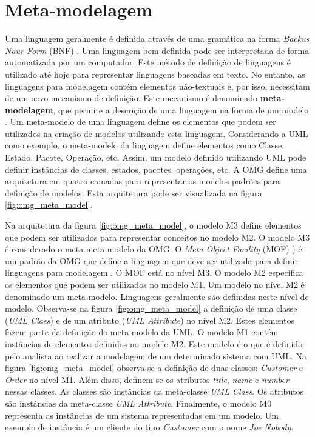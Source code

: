 \section{Meta-modelagem}

Uma linguagem geralmente é definida através de uma gramática na forma \textit{Backus Naur Form} (BNF) . Uma linguagem
bem definida pode ser interpretada de forma automatizada por um computador. Este método de definição de linguagens é utilizado até hoje para
representar linguagens baseadas em texto. No entanto, as linguagens para modelagem contém elementos não-textuais e, por isso, necessitam de um novo
mecanismo de definição. Este mecanismo é denominado \textbf{meta-modelagem}, que permite a descrição de uma linguagem na forma de um modelo
\cite{mda:03}. Um meta-modelo de uma linguagem define os elementos que podem ser utilizados na criação de modelos utilizando esta linguagem.
Considerando a UML como exemplo, o meta-modelo da linguagem define elementos como Classe, Estado, Pacote, Operação, etc. Assim, um modelo definido
utilizando UML pode definir instâncias de classes, estados, pacotes, operações, etc. A OMG define uma arquitetura em quatro camadas para representar
os modelos padrões para definição de modelos. Esta arquitetura pode ser visualizada
na figura \ref{fig:omg_meta_model}. 

Na arquitetura da figura \ref{fig:omg_meta_model}, o modelo M3 define elementos que podem ser utilizados para representar conceitos no
modelo M2. O modelo M3 é considerado o meta-meta-modelo da OMG. O \textit{Meta-Object Facility} (MOF)
) é um padrão da OMG que define a linguagem que
deve ser utilizada para definir linguagens para modelagem \cite{mof:11}. O MOF
está no nível M3. O modelo M2 especifica os elementos que podem ser utilizados no modelo M1.
Um modelo no nível M2 é denominado um meta-modelo. Linguagens geralmente são
definidas neste nível de modelo. Observa-se na figura \ref{fig:omg_meta_model} a
definição de uma classe (\textit{UML Class}) e de um atributo (\textit{UML Attribute}) 
no nível M2. Estes elementos fazem parte da definição do meta-modelo da UML. 
O modelo M1 contém instâncias de elementos definidos no modelo M2. Este modelo 
é o que é definido pelo analista ao realizar a modelagem de um determinado sistema com UML. Na figura
\ref{fig:omg_meta_model} observa-se a definição de duas classes: \textit{Customer} 
e \textit{Order} no nível M1. Além disso, definem-se os
atributos \textit{title}, \textit{name} e \textit{number} nessas classes. As
classes são instâncias da meta-classe \textit{UML Class}. Os atributos são
instâncias da meta-classe \textit{UML Attribute}. Finalmente, o modelo M0
representa as instâncias de um sistema representadas em um modelo. Um exemplo de
instância é um cliente do tipo \textit{Customer} com o nome \textit{Joe Nobody}.

